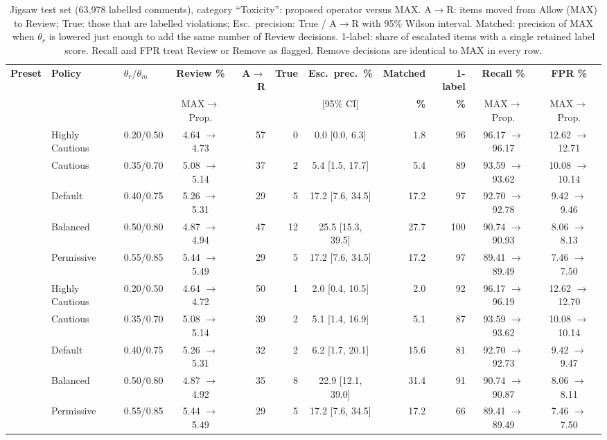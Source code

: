 \begin{table}[!t]
\caption{Jigsaw test set (63,978 labelled comments), category ``Toxicity'': proposed operator versus MAX.
A$\to$R: items moved from Allow (MAX) to Review; True: those that are labelled violations;
Esc.\ precision: True / A$\to$R with 95\% Wilson interval. Matched: precision of MAX when $\theta_r$ is lowered
just enough to add the same number of Review decisions. 1-label: share of escalated items with a single retained
label score. Recall and FPR treat Review or Remove as flagged.
Remove decisions are identical to MAX in every row.}
\label{tab:jigsaw-main}
\centering\scriptsize
\setlength{\tabcolsep}{3pt}
\begin{tabular}{@{}lllcrrcrrcc@{}}
\toprule
\textbf{Preset} & \textbf{Policy} & $\theta_r/\theta_m$ & \textbf{Review \%} & \textbf{A$\to$R} & \textbf{True} &
\textbf{Esc.\ prec.\ \%} & \textbf{Matched} & \textbf{1-label} & \textbf{Recall \%} & \textbf{FPR \%} \\
 & & & MAX$\to$Prop. & & & [95\% CI] & \textbf{\%} & \textbf{\%} & MAX$\to$Prop. & MAX$\to$Prop. \\
\midrule
{} & Highly Cautious & 0.20/0.50 & 4.64 $\to$ 4.73 & 57 & 0 & 0.0 [0.0, 6.3] & 1.8 & 96 & 96.17 $\to$ 96.17 & 12.62 $\to$ 12.71 \\
 & Cautious & 0.35/0.70 & 5.08 $\to$ 5.14 & 37 & 2 & 5.4 [1.5, 17.7] & 5.4 & 89 & 93.59 $\to$ 93.62 & 10.08 $\to$ 10.14 \\
 & Default & 0.40/0.75 & 5.26 $\to$ 5.31 & 29 & 5 & 17.2 [7.6, 34.5] & 17.2 & 97 & 92.70 $\to$ 92.78 & 9.42 $\to$ 9.46 \\
 & Balanced & 0.50/0.80 & 4.87 $\to$ 4.94 & 47 & 12 & 25.5 [15.3, 39.5] & 27.7 & 100 & 90.74 $\to$ 90.93 & 8.06 $\to$ 8.13 \\
 & Permissive & 0.55/0.85 & 5.44 $\to$ 5.49 & 29 & 5 & 17.2 [7.6, 34.5] & 17.2 & 97 & 89.41 $\to$ 89.49 & 7.46 $\to$ 7.50 \\
\midrule
{} & Highly Cautious & 0.20/0.50 & 4.64 $\to$ 4.72 & 50 & 1 & 2.0 [0.4, 10.5] & 2.0 & 92 & 96.17 $\to$ 96.19 & 12.62 $\to$ 12.70 \\
 & Cautious & 0.35/0.70 & 5.08 $\to$ 5.14 & 39 & 2 & 5.1 [1.4, 16.9] & 5.1 & 87 & 93.59 $\to$ 93.62 & 10.08 $\to$ 10.14 \\
 & Default & 0.40/0.75 & 5.26 $\to$ 5.31 & 32 & 2 & 6.2 [1.7, 20.1] & 15.6 & 81 & 92.70 $\to$ 92.73 & 9.42 $\to$ 9.47 \\
 & Balanced & 0.50/0.80 & 4.87 $\to$ 4.92 & 35 & 8 & 22.9 [12.1, 39.0] & 31.4 & 91 & 90.74 $\to$ 90.87 & 8.06 $\to$ 8.11 \\
 & Permissive & 0.55/0.85 & 5.44 $\to$ 5.49 & 29 & 5 & 17.2 [7.6, 34.5] & 17.2 & 66 & 89.41 $\to$ 89.49 & 7.46 $\to$ 7.50 \\
\bottomrule
\end{tabular}
\end{table}
